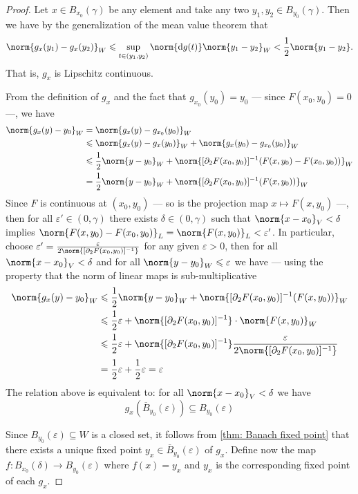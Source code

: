 \begin{proof}
Let \(x \in B_{x_0}(\gamma)\) be any element and take any two \(y_1, y_2 \in
B_{y_0}(\gamma)\). Then we have by the generalization of the mean value theorem
that
\[
  \norm{g_x(y_1) - g_x(y_{2})}_{W} \leq \sup_{t \in (y_1, y_2)} \norm{\diff g(t)}
  \norm{y_1 - y_2}_W < \frac{1}{2} \norm{y_1 - y_2}.
\]
That is, \(g_x\) is Lipschitz continuous.

From the definition of \(g_x\) and the fact that \(g_{x_0}(y_0) = y_0\) ---
since \(F(x_0, y_0) = 0\) ---, we have
\begin{align*}
  \norm{g_x(y) - y_0}_W
  &= \norm{g_x(y) - g_{x_0}(y_0)}_W \\
  &\leq \norm{g_x(y) - g_{x}(y_0)}_W + \norm{g_x(y_0) - g_{x_0}(y_0)}_W \\
  &\leq \frac{1}{2} \norm{y - y_0}_W + \norm{[\partial_2F(x_0, y_0)]^{-1}(F(x, y_0) -
    F(x_0, y_0))}_W \\
  &= \frac{1}{2} \norm{y - y_0}_W
    + \norm{[\partial_{2}F(x_{0}, y_{0})]^{-1}(F(x, y_0))}_W
\end{align*}
Since \(F\) is continuous at \((x_{0}, y_0)\) --- so is the projection
map \(x \mapsto F(x, y_0)\) ---, then for all \(\varepsilon' \in (0, \gamma)\) there
exists \(\delta \in (0, \gamma)\) such that \(\norm{x - x_0}_V < \delta\) implies \(\norm{F(x, y_0) -
  F(x_0, y_0)}_L = \norm{F(x, y_0)}_L < \varepsilon'\). In particular, choose \(\varepsilon' =
\frac{\varepsilon}{2 \norm{[\partial_{2}F(x_0, y_0)]^{-1}}}\) for any given \(\varepsilon > 0\), then for
all \(\norm{x - x_0}_V < \delta\) and for all \(\norm{y - y_0}_W \leq \varepsilon\) we have --- using
the property that the norm of linear maps is sub-multiplicative
\begin{align*}
  \norm{g_x(y) - y_0}_{W}
  &\leq \frac{1}{2} \norm{y - y_0}_{W} + \norm{[\partial_2F(x_0, y_0)]^{-1}(F(x, y_0))}_W
  \\
  &\leq \frac{1}{2} \varepsilon + \norm{[\partial_2F(x_0, y_0)]^{-1}} \cdot \norm{F(x, y_0)}_W
  \\
  &\leq \frac{1}{2}\varepsilon
    + \norm{[\partial_2F(x_0, y_0)]^{-1}} \frac{\varepsilon}{2 \norm{[\partial_2F(x_0, y_0)]^{-1}}}
  \\
  &= \frac{1}{2} \varepsilon + \frac{1}{2}\varepsilon = \varepsilon
\end{align*}
The relation above is equivalent to: for all \(\norm{x - x_0}_V < \delta\) we have
\[
  g_x(\overline{B}_{y_0}(\varepsilon)) \subseteq B_{y_0}(\varepsilon)
\]

Since \(B_{y_0}(\varepsilon) \subseteq W\) is a closed set, it follows from
\cref{thm: Banach fixed point} that there exists a unique fixed point \(y_x
\in \overline{B}_{y_0}(\varepsilon)\) of \(g_{x}\). Define now the map \(f: B_{x_0}(\delta) \to
B_{y_0}(\varepsilon)\) where \(f(x) = y_{x}\) and \(y_x\) is the corresponding fixed
point of each \(g_x\).


\end{proof}
